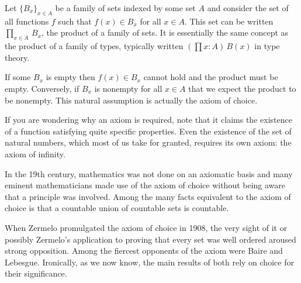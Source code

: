 \documentclass[11pt]{article}
\begin{document}
Let $\{B_x\}_{x\in A}$ be a family of sets indexed by some set $A$ and consider the set of all functions $f$ such that $f(x)\in B_x$ for all $x\in A$. This set can be written $\prod_{x\in A}\,B_x$, the product of a family of sets. It is essentially the same concept as the product of a family of types, typically written $(\prod x:A)\,B(x)$ in type theory.

If some $B_x$ is empty then $f(x)\in B_x$ cannot hold and the product must be empty. Conversely, if $B_x$ is nonempty for all $x\in A$ that we expect the product to be nonempty. This natural assumption is actually the axiom of choice.

If you are wondering why an axiom is required, note that it claims the existence of a function satisfying quite specific properties. Even the existence of the set of natural numbers, which most of us take for granted, requires its own axiom: the axiom of infinity.

In the 19th century, mathematics was not done on an axiomatic basis and many eminent mathematicians made use of the axiom of choice without being aware that a principle was involved. Among the many facts equivalent to the axiom of choice is that a countable union of countable sets is countable.

When Zermelo promulgated the axiom of choice in 1908, the very sight of it or possibly Zermelo's application to proving that every set was well ordered aroused strong opposition. Among the fiercest opponents of the axiom were Baire and Lebesgue. Ironically, as we now know, the main results of both rely on choice for their significance.
\end{document}

